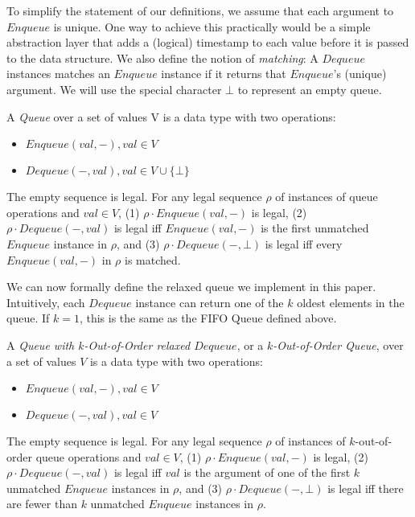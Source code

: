 \documentclass[a4paper,anonymous,USenglish]{lipics-v2021}
\theoremstyle{definition}
\begin{document}
To simplify the statement of our definitions, we assume that each argument to $Enqueue$ is unique.  One way to achieve this practically would be a simple abstraction layer that adds a (logical) timestamp to each value before it is passed to the data structure.  We also define the notion of \emph{matching}: A $Dequeue$ instances matches an $Enqueue$ instance if it returns that $Enqueue$'s (unique) argument.  We will use the special character $\bot$ to represent an empty queue.

\begin{definition}\label{def:FIFOQueue}
  A \emph{Queue} over a set of values V is a data type with two operations:
  \begin{itemize}
  \item $Enqueue(val,-), val \in V$ 
  \item $Dequeue(-, val), val \in V \cup \{\bot\}$ 
  \end{itemize}
  
  The empty sequence is legal.  For any legal sequence $\rho$ of instances of queue operations and $val \in V$, (1) $\rho \cdot Enqueue(val,-)$ is legal, (2) $\rho \cdot Dequeue(-,val)$ is legal iff $Enqueue(val, -)$ is the first unmatched $Enqueue$ instance in $\rho$, and (3) $\rho \cdot Dequeue(-, \bot)$ is legal iff every $Enqueue(val, -)$ in $\rho$ is matched.
\end{definition}

We can now formally define the relaxed queue we implement in this paper.  Intuitively, each $Dequeue$ instance can return one of the $k$ oldest elements in the queue.  If $k=1$, this is the same as the FIFO Queue defined above.

\begin{definition} A \emph{Queue with $k$-Out-of-Order relaxed $Dequeue$}, or a \emph{$k$-Out-of-Order Queue}, over a set of values $V$ is a data type with two operations:
  \begin{itemize}
  \item $Enqueue(val,-), val \in V$
  \item $Dequeue(-,val), val \in V$
  \end{itemize}

  The empty sequence is legal.  For any legal sequence $\rho$ of instances of $k$-out-of-order queue operations and $val \in V$, (1) $\rho \cdot Enqueue(val,-)$ is legal, (2) $\rho \cdot Dequeue(-,val)$ is legal iff $val$ is the argument of one of the first $k$ unmatched $Enqueue$ instances in $\rho$, and (3) $\rho \cdot Dequeue(-,\bot)$ is legal iff there are fewer than $k$ unmatched $Enqueue$ instances in $\rho$.
\end{definition}
\end{document}
